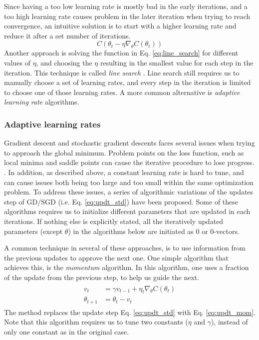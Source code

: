 Since having a too low learning rate is mostly bad in the early iterations, and a too high learning rate causes problem in the later iteration when trying to reach convergence, an intuitive solution is to start with a higher learning rate and reduce it after a set number of iterations.
\begin{equation}\label{eq:line_search}
    C(\theta_t - \eta \nabla_\theta C(\theta_t))
\end{equation}
Another approach is solving the function in Eq. \ref{eq:line_search} for different values of $\eta$, and choosing the $\eta$ resulting in the smallest value for each step in the iteration. This technique is called \textit{line search} \citep[p. 84]{Goodfellow-et-al-2016}.
Line search still requires us to manually choose a set of learning rates, and every step in the iteration is limited to choose one of those learning rates.
A more common alternative is \textit{adaptive learning rate} algorithms.

\subsubsection{Adaptive learning rates}
Gradient descent and stochastic gradient descents faces several issues when trying to approach the global minimum.
Problem points on the loss function, such as local minima and saddle points can cause the iterative procedure to lose progress. \citep[p. 116-117]{Ketkar2017}.
In addition, as described above, a constant learning rate is hard to tune, and can cause issues both being too large and too small within the same optimization problem.
To address these issues, a series of algorithmic variations of the updates step of GD/SGD (i.e. Eq. \ref{eq:updt_std}) have been proposed.
Some of these algorithms requires us to initialize different parameters that are updated in each iterations.
If nothing else is explicitly stated, all the iteratively updated parameters (except $\theta$) in the algorithms below are initiated as 0 or 0-vectors.

A common technique in several of these approaches, is to use information from the previous updates to approve the next one.
One simple algorithm that achieves this, is the \textit{momentum} algorithm.
In this algorithm, one uses a fraction of the update from the previous step, to help us guide the next.
\begin{align}\label{eq:updt_mom}
\begin{split}
    v_t &= \gamma v_{t-1} + \eta_t \nabla_{\theta}C(\theta_t) \\
    \theta_{t+1} &= \theta_t - v_t
\end{split}
\end{align}
The method replaces the update step Eq. \ref{eq:updt_std} with Eq. \ref{eq:updt_mom}.
Note that this algorithm requires us to tune two constants ($\eta$ and $\gamma$), instead of only one constant as in the original case.

